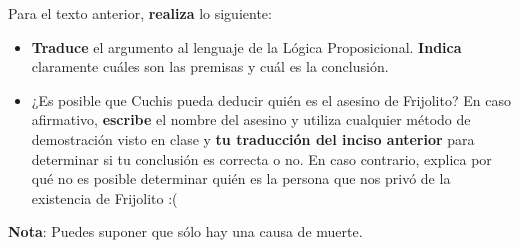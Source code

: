 \documentclass[oneside]{style}
\begin{document}
\begin{questions}[label=\protect\circled{\bfseries\arabic*}]
{        Para el texto anterior, \textbf{realiza} lo siguiente:
        \begin{itemize} 
            \item \textbf{Traduce} el argumento al lenguaje de la Lógica 
            Proposicional. \textbf{Indica} claramente cuáles son las premisas y
            cuál es la conclusión. 

            \item ¿Es posible que Cuchis pueda deducir quién es el asesino de 
            Frijolito? En caso afirmativo, \textbf{escribe} el nombre del 
            asesino y utiliza cualquier método de demostración visto en clase y 
            \textbf{tu traducción del inciso anterior} para determinar si tu 
            conclusión es correcta o no. En caso contrario, explica por qué no 
            es posible determinar quién es la persona que nos privó de la 
            existencia de Frijolito :(
        \end{itemize}

        \textbf{Nota}: Puedes suponer que sólo hay una causa de muerte. 
    }
\end{questions}
\end{document}
